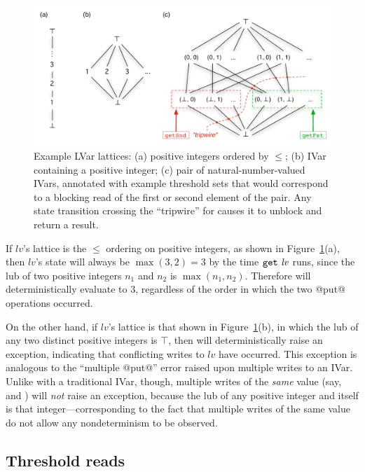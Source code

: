 \begin{figure}
\centering
\includegraphics[width=5in]{chapter2/figures/lvars-example-lattices.pdf} 
  \caption{Example LVar lattices: (a) positive integers ordered by
    $\leq$; (b) IVar containing a positive integer; (c) pair of
    natural-number-valued IVars, annotated with example threshold sets
    that would correspond to a blocking read of the first or second
    element of the pair.  Any state transition crossing the
    ``tripwire'' for  causes it to unblock and return
    a result.}
  \label{f:lvars-example-lattices}
\end{figure}

If $\mathit{lv}$'s lattice is the $\leq$ ordering on positive
integers, as shown in Figure~\ref{f:lvars-example-lattices}(a), then
$\mathit{lv}$'s state will always be $\max(3, 2) = 3$ by the time
$\mbox{\texttt{get}}~\mathit{lv}$ runs, since the lub of two positive integers $n_1$
and $n_2$ is $\max(n_1, n_2)$.  Therefore  will
deterministically evaluate to $3$, regardless of the order in which
the two @put@ operations occurred.

On the other hand, if $\mathit{lv}$'s lattice is that shown in
Figure~\ref{f:lvars-example-lattices}(b), in which the lub of any two
distinct positive integers is $\top$, then  will
deterministically raise an exception, indicating that conflicting
writes to $\mathit{lv}$ have occurred.  This exception is analogous to
the ``multiple @put@'' error raised upon multiple writes to an IVar.
Unlike with a traditional IVar, though, multiple writes of the
\emph{same} value (say,  and
) will \emph{not} raise an exception, because
the lub of any positive integer and itself is that
integer---corresponding to the fact that multiple writes of the same
value do not allow any nondeterminism to be observed.

\subsection{Threshold reads}

